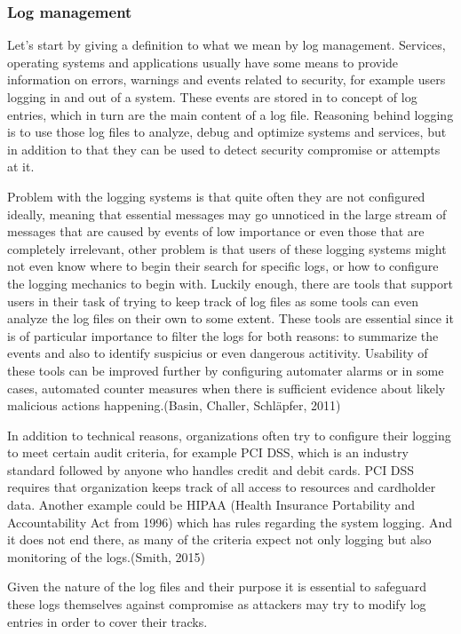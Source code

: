 \documentclass{article}
\begin{document}
\subsubsection{Log management}
Let's start by giving a definition to what we mean by log management. Services, operating systems and applications usually have some means to provide information on errors, warnings and events related to security, for example users logging in and out of a system. These events are stored in to concept of log entries, which in turn are the main content of a log file. Reasoning behind logging is to use those log files to analyze, debug and optimize systems and services, but in addition to that they can be used to detect security compromise or attempts at it.
\par
Problem with the logging systems is that quite often they are not configured ideally, meaning that essential messages may go unnoticed in the large stream of messages that are caused by events of low importance or even those that are completely irrelevant, other problem is that users of these logging systems might not even know where to begin their search for specific logs, or how to configure the logging mechanics to begin with. Luckily enough, there are tools that support users in their task of trying to keep track of log files as some tools can even analyze the log files on their own to some extent. These tools are essential since it is of particular importance to filter the logs for both reasons: to summarize the events and also to identify suspicius or even dangerous actitivity. Usability of these tools can be improved further by configuring automater alarms or in some cases, automated counter measures when there is sufficient evidence about likely malicious actions happening.(Basin, Challer, Schläpfer, 2011)
\par
In addition to technical reasons, organizations often try to configure their logging to meet certain audit criteria, for example PCI DSS, which is an industry standard followed by anyone who handles credit and debit cards. PCI DSS requires that organization keeps track of all access to resources and cardholder data. Another example could be HIPAA (Health Insurance Portability and Accountability Act from 1996) which has rules regarding the system logging. And it does not end there, as many of the criteria expect not only logging but also monitoring of the logs.(Smith, 2015)
\par
Given the nature of the log files and their purpose it is essential to safeguard these logs themselves against compromise as attackers may try to modify log entries in order to cover their tracks.
\end{document}
